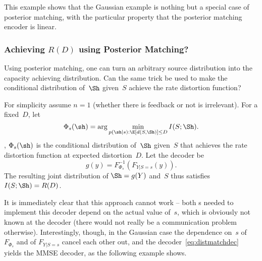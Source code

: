 This example shows that the Gaussian example is nothing but a special case of
posterior matching, with the particular property that the posterior matching
encoder is linear.


\subsubsection{Achieving $R(D)$ using Posterior Matching?}

Using posterior matching,  one can turn an arbitrary source distribution into
the capacity achieving distribution. Can the same trick be used to make the
conditional distribution of~$\Sh$ given~$S$ achieve the rate distortion
function? 

For simplicity assume $n = 1$ (whether there is feedback or not is irrelevant).
For a fixed~$D$, let
\begin{equation*}
  \Phi_s(\sh) = \arg\min_{p(\sh|s): \E[d(S,\Sh)] \le D} I(S;\Sh).
\end{equation*}
\Ie, $\Phi_s(\sh)$ is the conditional distribution of~$\Sh$ given~$S$ that
achieves the rate distortion function at expected distortion~$D$. Let the
decoder be
\begin{equation}
  \label{eq:distmatchdec}
  g(y) = F_{\Phi_s}^{-1}(F_{Y|S=s}(y)).
\end{equation}
The resulting joint distribution of $\Sh = g(Y)$ and~$S$ thus satisfies
$I(S;\Sh) = R(D)$. 

It is immediately clear that this approach cannot work -- both \cdf s needed to
implement this decoder depend on the actual value of~$s$, which is obviously not
known at the decoder (there would not really be a communication problem
otherwise). Interestingly, though, in the Gaussian case the dependence on~$s$ of
$F_{\Phi_s}$ and of $F_{Y|S=s}$ cancel each other out, and the
decoder~\eqref{eq:distmatchdec} yields the MMSE decoder, as the following
example shows.

